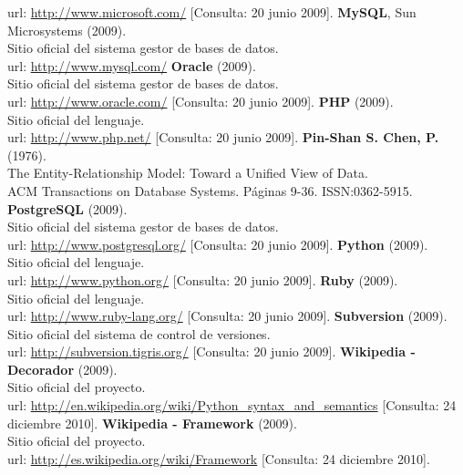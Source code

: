 \begin{thebibliography}{xx}
         url: \url{http://www.microsoft.com/}
         [Consulta: 20 junio 2009].
 \textbf{MySQL}, Sun Microsystems (2009).\\
         Sitio oficial del sistema gestor de bases de datos.\\
         url: \url{http://www.mysql.com/}
 \textbf{Oracle} (2009).\\
         Sitio oficial del sistema gestor de bases de datos.\\
         url: \url{http://www.oracle.com/}
         [Consulta: 20 junio 2009].
 \textbf{PHP} (2009).\\
         Sitio oficial del lenguaje.\\
         url: \url{http://www.php.net/}
         [Consulta: 20 junio 2009].
 \textbf{Pin-Shan S. Chen, P.} (1976).\\
         The Entity-Relationship Model: Toward a Unified View of Data. \\
         ACM Transactions on Database Systems. Páginas 9-36.
         ISSN:0362-5915.
 \textbf{PostgreSQL} (2009).\\
         Sitio oficial del sistema gestor de bases de datos.\\
         url: \url{http://www.postgresql.org/}
         [Consulta: 20 junio 2009].
 \textbf{Python} (2009).\\
         Sitio oficial del lenguaje.\\
         url: \url{http://www.python.org/}
         [Consulta: 20 junio 2009].
 \textbf{Ruby} (2009).\\
         Sitio oficial del lenguaje.\\
         url: \url{http://www.ruby-lang.org/}
         [Consulta: 20 junio 2009].
 \textbf{Subversion} (2009).\\
         Sitio oficial del sistema de control de versiones.\\
         url: \url{http://subversion.tigris.org/}
         [Consulta: 20 junio 2009].
 \textbf{Wikipedia - Decorador} (2009).\\
         Sitio oficial del proyecto.\\
         url: \url{http://en.wikipedia.org/wiki/Python_syntax_and_semantics}
         [Consulta: 24 diciembre 2010].
 \textbf{Wikipedia - Framework} (2009).\\
         Sitio oficial del proyecto.\\
         url: \url{http://es.wikipedia.org/wiki/Framework}
         [Consulta: 24 diciembre 2010].
 \end{thebibliography}
